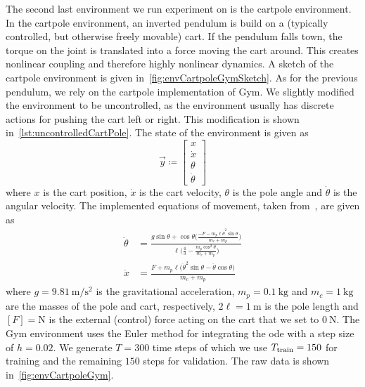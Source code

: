 			The second last environment we run experiment on is the cartpole environment. In the cartpole environment, an inverted pendulum is build on a (typically controlled, but otherwise freely movable) cart. If the pendulum falls town, the torque on the joint is translated into a force moving the cart around. This creates nonlinear coupling and therefore highly nonlinear dynamics. A sketch of the cartpole environment is given in~\autoref{fig:envCartpoleGymSketch}. As for the previous pendulum, we rely on the cartpole implementation of Gym. We slightly modified the environment to be uncontrolled, as the environment usually has discrete actions for pushing the cart left or right. This modification is shown in~\autoref{lst:uncontrolledCartPole}. The state of the environment is given as
			\begin{equation*}
				\vec{y} \coloneqq
					\begin{bmatrix}
						x \\
						\dot{x} \\
						\theta \\
						\dot{\theta}
					\end{bmatrix}
			\end{equation*}
			where \(x\) is the cart position, \(\dot{x}\) is the cart velocity, \(\theta\) is the pole angle and \(\dot{\theta}\) is the angular velocity. The implemented equations of movement, taken from~\cite{florianCorrectEquationsDynamics2005}, are given as
			\begin{align*}
				\ddot{\theta} &= \frac{g \sin\theta + \cos\theta \Big(\! \frac{-F - m_p \ell \dot{\theta}^2 \sin\theta}{m_c + m_p} \!\Big)}{\ell \Big(\! \frac{4}{3} - \frac{m_p \cos^2\theta}{m_c + m_p} \!\Big)} \\
				\ddot{x} &= \frac{F + m_p \ell \big( \dot{\theta}^2 \sin\theta - \ddot{\theta} \cos\theta \big)}{m_c + m_p}
			\end{align*}
			where \( g = \SI{9.81}{\meter\per\second\squared} \) is the gravitational acceleration, \( m_p = \SI{0.1}{\kilogram} \) and \( m_c = \SI{1}{\kilogram} \) are the masses of the pole and cart, respectively, \( 2\ell = \SI{1}{\meter} \) is the pole length and \( [F] = \si{\newton} \) is the external (control) force acting on the cart that we set to \( \SI{0}{\newton} \). The Gym environment uses the Euler method for integrating the \ac{ode} with a step size of \( h = 0.02 \). We generate \( T = 300 \) time steps of which we use \( T_{\mathrm{train}} = 150 \) for training and the remaining \(150\) steps for validation. The raw data is shown in~\autoref{fig:envCartpoleGym}.

